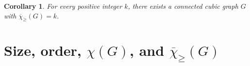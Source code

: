 \documentclass{article}
\newtheorem{corollary}[theorem]{Corollary}
\theoremstyle{definition}
\newcommand{\mc}{\overline{\chi}_{\geqslant}}
\newcommand{\cg}{{\rm C}_{\geqslant}}
\newcommand{\cs}[1]{{\textcolor{blue}{#1}}}
\newcommand{\hf}[1]{ \textcolor{orange}{HF: #1}}
\begin{document}

    \begin{corollary}
For every positive integer $k$, there exists a connected cubic graph $G$ with \mbox{$\mc(G)=k$.}
\end{corollary}    
\section{
Size, order, $\chi(G)$, and $\mc(G)$}  \label{sec:min-max}
\end{document}
